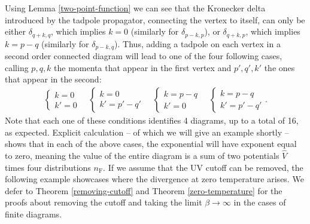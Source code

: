 Using Lemma \ref{two-point-function} we can see that the Kronecker delta introduced by the
tadpole propagator, connecting the vertex to itself, can only be either $\delta_{q+k,q}$,
which implies $k=0$ (similarly for $\delta_{p-k,p}$), or $\delta_{q+k,p}$, which implies
$k=p-q$ (similarly for $\delta_{p-k,q}$). Thus, adding a tadpole on each vertex in a second
order connected diagram will lead to one of the four following cases, calling $p,q,k$ the
momenta that appear in the first vertex and $p',q',k'$ the ones that appear in the second:
\begin{align*}
	\begin{cases}
		k = 0 \\ k' = 0
	\end{cases}
	\quad
	\begin{cases}
		k = 0 \\ k' = p' - q'
	\end{cases}
	\quad
	\begin{cases}
		k = p - q \\ k' = 0
	\end{cases}
	\quad
	\begin{cases}
		k = p - q \\ k' = p' - q'
	\end{cases}.
\end{align*}
Note that each one of these conditions identifies 4 diagrams, up to a total of 16, as expected.
Explicit calculation -- of which we will give an example shortly -- shows that in each of the
above cases, the exponential will have exponent equal to zero, meaning the value of the entire
diagram is a sum of two potentials $\hat{V}$ times four distributions $n_{\mathrm{F}}$.
If we assume that the UV cutoff can be removed, the following example showcases where the
divergence at zero temperature arises. We defer to Theorem \ref{removing-cutoff} and Theorem
\ref{zero-temperature} for the proofs about removing the cutoff and taking the limit
$\beta\to\infty$ in the cases of finite diagrams.
